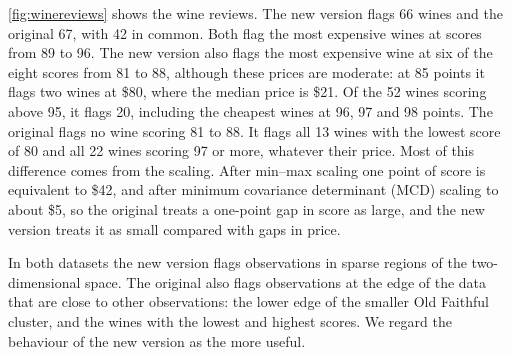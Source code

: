 \cref{fig:winereviews} shows the wine reviews. The new version flags 66 wines and the original 67, with 42 in common. Both flag the most expensive wines at scores from 89 to 96. The new version also flags the most expensive wine at six of the eight scores from 81 to 88, although these prices are moderate: at 85 points it flags two wines at \$80, where the median price is \$21. Of the 52 wines scoring above 95, it flags 20, including the cheapest wines at 96, 97 and 98 points. The original flags no wine scoring 81 to 88. It flags all 13 wines with the lowest score of 80 and all 22 wines scoring 97 or more, whatever their price. Most of this difference comes from the scaling. After min--max scaling one point of score is equivalent to \$42, and after minimum covariance determinant (MCD) scaling to about \$5, so the original treats a one-point gap in score as large, and the new version treats it as small compared with gaps in price.

In both datasets the new version flags observations in sparse regions of the two-dimensional space. The original also flags observations at the edge of the data that are close to other observations: the lower edge of the smaller Old Faithful cluster, and the wines with the lowest and highest scores. We regard the behaviour of the new version as the more useful.

